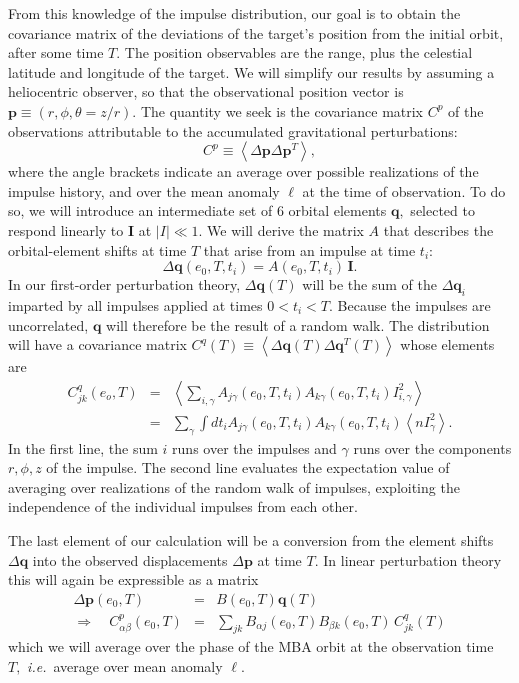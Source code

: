 \documentclass[linenumbers, onecolumn]{aastex631}
\newcommand{\ie}{\textit{i.e.\/}}
\newcommand{\vecI}{\mathbf{I}}
\newcommand{\vecp}{\mathbf{p}}
\newcommand{\vecq}{\mathbf{q}}
\newcommand{\matA}{A}
\newcommand{\matB}{B}
\newcommand{\covm}{C}
\newcommand{\ma}{\ell}  %
\begin{document}
From this knowledge of the impulse distribution, our goal is to obtain
the covariance matrix of the deviations of the target's position from
the initial orbit, after some time $T.$ The position observables are
the range, plus the celestial latitude and longitude of the target.  We will simplify our results by assuming a heliocentric observer, so that the observational position vector is $\vecp\equiv (r,\phi,\theta=z/r).$ The quantity we seek is the covariance matrix $\covm^p$ of the observations attributable to the accumulated gravitational perturbations:
\begin{equation}
  \covm^p  \equiv  \left\langle  \Delta\vecp \Delta\vecp^T\right\rangle,  \label{eq:Cp}
\end{equation}
where the angle brackets indicate an average over possible
realizations of the impulse history, and over the mean anomaly $\ma$
at the time of observation.  To do so, we will introduce an
intermediate set of 6 orbital elements $\vecq,$ selected to respond linearly to $\vecI$ at $|I|\ll 1.$
We will derive the matrix $\matA$ that describes the orbital-element shifts at time $T$ that arise from an impulse at time $t_i$: 
\begin{equation}
  \Delta \vecq(e_0,T,t_i) = \matA(e_0, T, t_i) \, \vecI.
  \label{eq:A}
\end{equation}
In our first-order perturbation theory, $\Delta\vecq(T)$ will be the sum of the $\Delta\vecq_i$ imparted by all impulses applied at times $0<t_i<T.$  Because the impulses are uncorrelated, $\vecq$ will therefore be the result of a random walk.  The distribution will have a covariance matrix $\covm^q(T) \equiv \left\langle \Delta\vecq(T) \Delta\vecq^T(T) \right\rangle$ whose elements are
\begin{eqnarray}
  \covm^q_{jk}(e_o,T) & = & \left\langle \sum_{i,\gamma} \matA_{j\gamma}(e_0,T,t_i) \matA_{k\gamma}(e_0,T,t_i) I^2_{i,\gamma} \right\rangle \\
           & = & \sum_\gamma \int dt_i \matA_{j\gamma}(e_0,T,t_i) \matA_{k\gamma}(e_0,T,t_i) \left\langle n I_\gamma^2\right\rangle.
\label{eq:Cqjk}
\end{eqnarray}
In the first line, the sum $i$ runs over the impulses and $\gamma$ runs over the components $r,\phi,z$ of the impulse. The second line evaluates the expectation value of averaging over realizations of the random walk of impulses, exploiting the independence of the individual impulses from each other.

The last element of our calculation will be a conversion from the
element shifts $\Delta\vecq$ into the observed displacements $\Delta\vecp$
at time $T.$  In linear perturbation theory this will again be expressible as a matrix
\begin{eqnarray}
\label{eq:B}
  \Delta\vecp(e_0,T) & = & \matB(e_0,T) \vecq(T) \\
  \Rightarrow \quad 
  \covm^p_{\alpha\beta}(e_0,T) & = & \sum_{jk} B_{\alpha j}(e_0,T)
                                     B_{\beta k}(e_0,T) \, \covm^q_{jk}(T) 
\label{eq:covp}
\end{eqnarray}
which we will average over the phase of the MBA orbit at the
observation time $T,$ \ie\ average over mean anomaly $\ma.$
\end{document}
